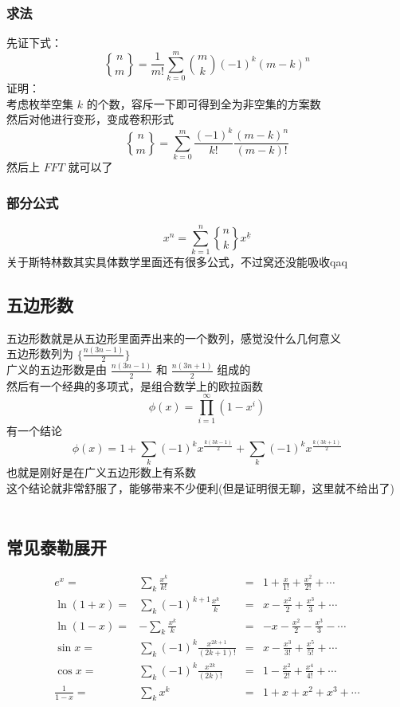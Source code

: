 	\subsubsection{求法}
	先证下式：
	$$
	{n\brace m}=\frac{1}{m!}\sum_{k=0}^m\binom{m}{k}(-1)^k(m-k)^n
	$$
	证明：\\
	考虑枚举空集 $k$ 的个数，容斥一下即可得到全为非空集的方案数\\
	然后对他进行变形，变成卷积形式
	$$
	{n\brace m}=\sum_{k=0}^{m}\frac{(-1)^k}{k!}\frac{(m-k)^n}{(m-k)!}
	$$
	然后上 $FFT$ 就可以了
	\subsubsection{部分公式}
	$$
	x^n=\sum_{k=1}^{n}{n\brace k}x^{\underline{k}}
	$$
	关于斯特林数其实具体数学里面还有很多公式，不过窝还没能吸收qaq
	\newpage
	\subsection{五边形数}
	五边形数就是从五边形里面弄出来的一个数列，感觉没什么几何意义\\
	五边形数列为 $\displaystyle \{\frac{n(3n-1)}{2} \}$\\
	广义的五边形数是由 $\frac{n(3n-1)}{2}$ 和 $\frac{n(3n+1)}{2}$ 组成的\\
	然后有一个经典的多项式，是组合数学上的欧拉函数 
	$$
	\phi(x)=\prod_{i=1}^\infty (1-x^i)
	$$
	有一个结论
	$$
	\phi(x)=1+\sum_k (-1)^kx^{\frac{k(3k-1)}{2} }+\sum_k(-1)^kx^{\frac{k(3k+1)}{2} }
	$$
	也就是刚好是在广义五边形数上有系数\\
	这个结论就非常舒服了，能够带来不少便利(但是证明很无聊，这里就不给出了)\\
	\vspace{3cm}
	~\\
	\subsection{常见泰勒展开}
	$$
	\begin{aligned}
	e^x=&\sum_k\frac{x^k}{k!}&=&1+\frac{x}{1!}+\frac{x^2}{2!}+\cdots\\
	\ln(1+x)=&\sum_k(-1)^{k+1}\frac{x^k}{k}&=&x-\frac{x^2}{2}+\frac{x^3}{3}+\cdots\\
	\ln(1-x)=&-\sum_k\frac{x^k}{k}&=&-x-\frac{x^2}{2}-\frac{x^3}{3}-\cdots\\
	\sin x=&\sum_k (-1)^k\frac{x^{2k+1}}{(2k+1)!}&=&x-\frac{x^3}{3!}+\frac{x^5}{5!}+\cdots\\
	\cos x=&\sum_k (-1)^k\frac{x^{2k}}{(2k)!}&=&1-\frac{x^2}{2!}+\frac{x^4}{4!}+\cdots\\
	\frac{1}{1-x}=&\sum_k x^k&=&1+x+x^2+x^3+\cdots
	\end{aligned}
	$$
	\newpage
